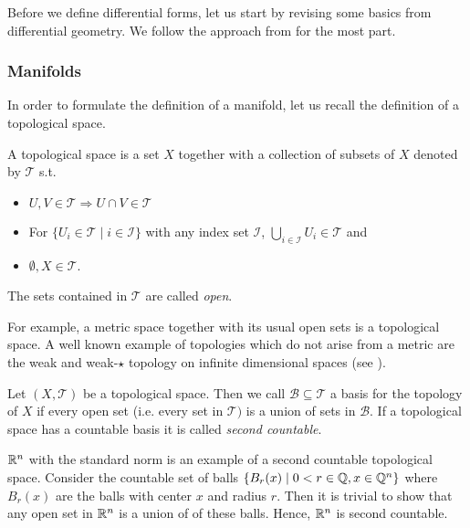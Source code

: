 \documentclass[../main.tex]{subfiles}
\begin{document}
Before we define differential forms, let us start by revising some basics
from differential geometry. We follow the approach from 
\cite[Sec. II]{topology_and_geometry} for the most part. 

\subsubsection{Manifolds}

In order to formulate the definition of a manifold, let us recall the 
definition of a topological space.
\begin{definition}
    A topological space is a set $X$ together with a collection of subsets of 
    $X$ denoted by $\mathcal{T}$ s.t.
    \begin{itemize}
        \item $U,V \in \mathcal{T} \Rightarrow U \cap V \in \mathcal{T}$
        \item For $\{ U_i \in \mathcal{T} \mid i \in \mathcal{I} \}$
            with any index set $\mathcal{I}$, 
            $\bigcup_{i\in \mathcal{I}} U_i \in \mathcal{T}$ and
        \item $\emptyset, X \in \mathcal{T}$.
    \end{itemize}
    The sets contained in $\mathcal{T}$ are called \textit{open}.
\end{definition}
For example, a metric space together with its usual open sets is a topological
space. A well known example of topologies which do not arise from a metric
are the weak and weak-$\star$ topology on infinite dimensional spaces
(see \cite[Ch.\,3]{brezis}).

\begin{definition}
    Let $(X,\mathcal{T})$ be a topological space. Then we call 
    $\mathcal{B}\subseteq \mathcal{T}$ a basis for the topology of $X$ if 
    every open set (i.e. every set in $\mathcal{T})$ is a union of sets 
    in $\mathcal{B}$. If a topological space has a countable basis it is called
    \textit{second countable}.
\end{definition}
$\mathbb{R}^n$ with the standard norm is an example of a second countable topological space. Consider 
the countable set of balls $\{ B_r(x) \mid 0 < r \in \mathbb{Q}, x \in \mathbb{Q}^n\}$
where $ B_r(x)$ are the balls with center $x$ and radius $r$.
Then it is trivial to show that any open set in $\mathbb{R}^n$ is a union of 
of these balls. Hence, $\mathbb{R}^n$ is second countable.
\end{document}

